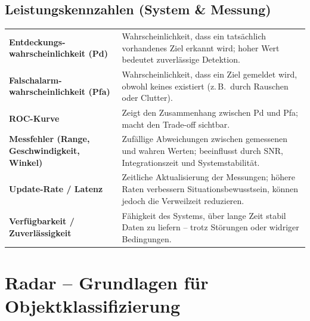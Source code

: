 \subsection{Leistungskennzahlen (System \& Messung)}
\begin{tabular}{p{} p{}}
\textbf{Entdeckungs- wahrscheinlichkeit (Pd)} & Wahrscheinlichkeit, dass ein tatsächlich vorhandenes Ziel erkannt wird; hoher Wert bedeutet zuverlässige Detektion. \\[0.5em]
\textbf{Falschalarm- wahrscheinlichkeit (Pfa)} & Wahrscheinlichkeit, dass ein Ziel gemeldet wird, obwohl keines existiert (z.\,B.\ durch Rauschen oder Clutter). \\[0.5em]
\textbf{ROC-Kurve} & Zeigt den Zusammenhang zwischen Pd und Pfa; macht den Trade-off sichtbar. \\[0.5em]
\textbf{Messfehler (Range, Geschwindigkeit, Winkel)} & Zufällige Abweichungen zwischen gemessenen und wahren Werten; beeinflusst durch SNR, Integrationszeit und Systemstabilität. \\[0.5em]
\textbf{Update-Rate / Latenz} & Zeitliche Aktualisierung der Messungen; höhere Raten verbessern Situationsbewusstsein, können jedoch die Verweilzeit reduzieren. \\[0.5em]
\textbf{Verfügbarkeit / Zuverlässigkeit} & Fähigkeit des Systems, über lange Zeit stabil Daten zu liefern – trotz Störungen oder widriger Bedingungen. \\
\end{tabular}


\section{Radar – Grundlagen für Objektklassifizierung}

